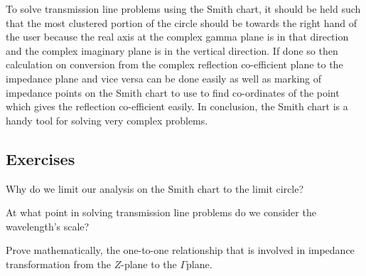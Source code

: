 To solve transmission line problems using the Smith chart, it should be held such that the most clustered portion of the circle should be towards the right hand of the user because the real axis at the complex gamma plane is in that direction and the complex imaginary plane is in the vertical direction. If done so then calculation on conversion from the complex reflection co-efficient plane to the impedance plane and vice versa can be done easily as well as marking of impedance points on the Smith chart to use to find co-ordinates of the point which gives the reflection co-efficient easily. In conclusion, the Smith chart is a handy tool for solving very complex  problems.


\begin{mdframed}[ backgroundcolor=lightblue, linewidth=1pt, hidealllines=true]
\section*{Exercises}
\begin{ExerciseList}
\Exercise[label={ex32}]
Why do we limit our analysis on the Smith chart to the limit circle?


\Exercise[label={ex34}]
At what point in solving transmission line problems do we consider the wavelength's scale?

\Exercise[label={ex34}]
Prove mathematically, the one-to-one relationship that is involved in impedance transformation from the ${Z}$-plane to the $\Gamma$\textemdash plane.
\end{ExerciseList}
\end{mdframed}
